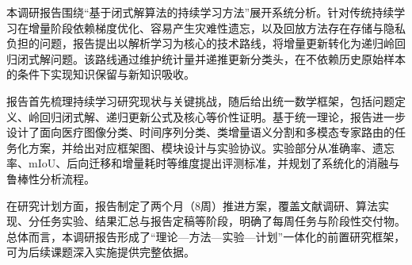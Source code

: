 

\begin{abstractzh}

本调研报告围绕“基于闭式解算法的持续学习方法”展开系统分析。针对传统持续学习在增量阶段依赖梯度优化、容易产生灾难性遗忘，以及回放方法存在存储与隐私负担的问题，报告提出以解析学习为核心的技术路线，将增量更新转化为递归岭回归闭式解问题。该路线通过维护统计量并递推更新分类头，在不依赖历史原始样本的条件下实现知识保留与新知识吸收。

报告首先梳理持续学习研究现状与关键挑战，随后给出统一数学框架，包括问题定义、岭回归闭式解、递归更新公式及核心等价性证明。基于统一理论，报告进一步设计了面向医疗图像分类、时间序列分类、类增量语义分割和多模态专家路由的任务化方案，并给出对应框架图、模块设计与实验协议。实验部分从准确率、遗忘率、mIoU、后向迁移和增量耗时等维度提出评测标准，并规划了系统化的消融与鲁棒性分析流程。

在研究计划方面，报告制定了两个月（8周）推进方案，覆盖文献调研、算法实现、分任务实验、结果汇总与报告定稿等阶段，明确了每周任务与阶段性交付物。总体而言，本调研报告形成了“理论—方法—实验—计划”一体化的前置研究框架，可为后续课题深入实施提供完整依据。

\end{abstractzh}
